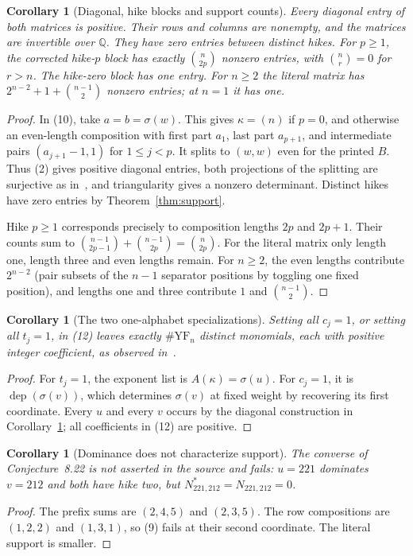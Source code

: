 \documentclass[11pt]{article}
\newtheorem{corollary}[theorem]{Corollary}
\begin{document}
\begin{corollary}[Diagonal, hike blocks and support counts]\label{cor:counts}
Every diagonal entry of both matrices is positive. Their rows and columns
are nonempty, and the matrices are invertible over $\mathbb Q$.
They have zero entries between distinct hikes. For $p\ge1$, the corrected
hike-$p$ block has exactly $\binom n{2p}$ nonzero entries, with
$\binom nr=0$ for $r>n$. The hike-zero block has one entry.
For $n\ge2$ the literal matrix has $2^{n-2}+1+\binom{n-1}{2}$
nonzero entries; at $n=1$ it has one.
\end{corollary}
\begin{proof}
In (10), take $a=b=\sigma(w)$. This gives $\kappa=(n)$ if $p=0$,
and otherwise an even-length composition with first part $a_1$,
last part $a_{p+1}$, and intermediate pairs $(a_{j+1}-1,1)$ for
$1\le j<p$. It splits to $(w,w)$ even for the printed $B$.
Thus (2) gives positive diagonal entries, both projections of the
splitting are surjective as in~\cite[Lemma~8.14]{PS}, and triangularity
gives a nonzero determinant. Distinct hikes have zero entries by
Theorem~\ref{thm:support}.

Hike $p\ge1$ corresponds precisely to composition lengths $2p$ and
$2p+1$. Their counts sum to
$\binom{n-1}{2p-1}+\binom{n-1}{2p}=\binom n{2p}$.
For the literal matrix only length one, length three and even lengths
remain. For $n\ge2$, the even lengths contribute $2^{n-2}$ (pair subsets
of the $n-1$ separator positions by toggling one fixed position),
and lengths one and three contribute $1$ and $\binom{n-1}{2}$.
\end{proof}

\begin{corollary}[The two one-alphabet specializations]\label{cor:alphabets}
Setting all $c_j=1$, or setting all $t_j=1$, in (12) leaves exactly
$\#\mathrm{YF}_n$ distinct monomials, each with positive integer
coefficient, as observed in~\cite[\S8.5, opening paragraph]{PS}.
\end{corollary}
\begin{proof}
For $t_j=1$, the exponent list is $A(\kappa)=\sigma(u)$.
For $c_j=1$, it is $\operatorname{dep}(\sigma(v))$, which determines
$\sigma(v)$ at fixed weight by recovering its first coordinate.
Every $u$ and every $v$ occurs by the diagonal construction in
Corollary~\ref{cor:counts}; all coefficients in (12) are positive.
\end{proof}

\begin{corollary}[Dominance does not characterize support]\label{cor:converse}
The converse of Conjecture~8.22 is not asserted in the source and fails:
$u=221$ dominates $v=212$ and both have hike two, but
$N^*_{221,212}=N_{221,212}=0$.
\end{corollary}
\begin{proof}
The prefix sums are $(2,4,5)$ and $(2,3,5)$.
The row compositions are $(1,2,2)$ and $(1,3,1)$, so (9) fails
at their second coordinate. The literal support is smaller.
\end{proof}
\end{document}

